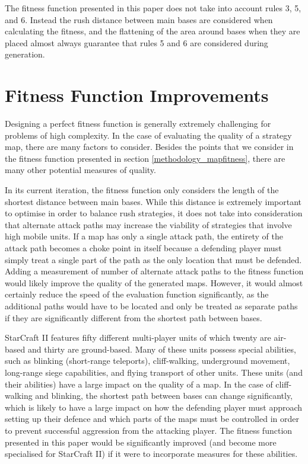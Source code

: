 The fitness function presented in this paper does not take into account rules 3, 5, and 6. Instead the rush distance between main bases are considered when calculating the fitness, and the flattening of the area around bases when they are placed almost always guarantee that rules 5 and 6 are considered during generation.

\section{Fitness Function Improvements}
\label{futurework_fitness}
Designing a perfect fitness function is generally extremely challenging for problems of high complexity. In the case of evaluating the quality of a strategy map, there are many factors to consider. Besides the points that we consider in the fitness function presented in section \ref{methodology_mapfitness}, there are many other potential measures of quality. 

In its current iteration, the fitness function only considers the length of the shortest distance between main bases. While this distance is extremely important to optimise in order to balance rush strategies, it does not take into consideration that alternate attack paths may increase the viability of strategies that involve high mobile units. If a map has only a single attack path, the entirety of the attack path becomes a choke point in itself because a defending player must simply treat a single part of the path as the only location that must be defended. Adding a measurement of number of alternate attack paths to the fitness function would likely improve the quality of the generated maps. However, it would almost certainly reduce the speed of the evaluation function significantly, as the additional paths would have to be located and only be treated as separate paths if they are significantly different from the shortest path between bases.

StarCraft II features fifty different multi-player units of which twenty are air-based and thirty are ground-based. Many of these units possess special abilities, such as blinking (short-range teleports), cliff-walking, underground movement, long-range siege capabilities, and flying transport of other units. These units (and their abilities) have a large impact on the quality of a map. In the case of cliff-walking and blinking, the shortest path between bases can change significantly, which is likely to have a large impact on how the defending player must approach setting up their defence and which parts of the maps must be controlled in order to prevent successful aggression from the attacking player. The fitness function presented in this paper would be significantly improved (and become more specialised for StarCraft II) if it were to incorporate measures for these abilities.

